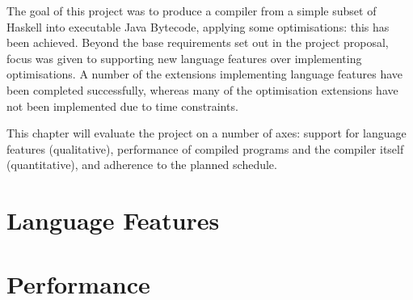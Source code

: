 \documentclass[dissertation.tex]{subfiles}
\begin{document}
The goal of this project was to produce a compiler from a simple subset of Haskell into executable Java Bytecode,
applying some optimisations: this has been achieved. Beyond the base requirements set out in the project proposal, focus
was given to supporting new language features over implementing optimisations. A number of the extensions implementing
language features have been completed successfully, whereas many of the optimisation extensions have not been
implemented due to time constraints.

This chapter will evaluate the project on a number of axes: support for language features (qualitative), performance of
compiled programs and the compiler itself (quantitative), and adherence to the planned schedule.

\section{Language Features}
{

}
\section{Performance}
{

}
\end{document}
